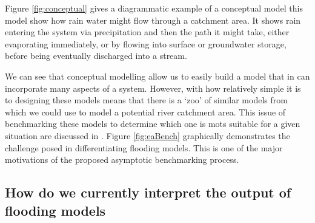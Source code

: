 \documentclass[11pt]{article}
\begin{document}
\hspace{0.05\textwidth}
\begin{minipage}{0.4\textwidth}
    \qquad Figure \ref{fig:conceptual} gives a diagrammatic example of a conceptual model this model show how rain water might flow through a catchment area. It shows rain entering the system via precipitation and then the path it might take, either evaporating immediately, or by flowing into surface or groundwater storage, before being eventually discharged into a stream.

    \qquad We can see that conceptual modelling allow us to easily build a model that in can incorporate many aspects of a system. However, with how relatively simple it is to designing these models means that there is a `zoo' of similar models from which we could use to model a potential river catchment area. This issue of benchmarking these models to determine which one is mots suitable for a given situation are discussed in \cite{neelz2013benchmarking}. 
    Figure \ref{fig:eaBench}  graphically demonstrates the challenge posed in differentiating flooding models. This is one of the major motivations of the proposed asymptotic benchmarking process.
\end{minipage}



\subsection{How do we currently interpret the output of flooding models}
\end{document}
